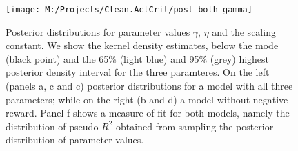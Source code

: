 \documentclass[]{rsos}%
\begin{document}
\begin{figure}

{\centering \texttt{[image: M:/Projects/Clean.ActCrit/post\_both\_gamma]} 

}

\caption{Posterior distributions for parameter values $\gamma$, $\eta$ and the scaling constant. We show the kernel density estimates, below the mode (black point) and the 65\% (light blue) and 95\% (grey)  highest posterior density interval for the three paramteres. On the left (panels a, c and c) posterior distributions for a model with   all three parameters; while on the right (b and d) a model without negative reward. Panel f shows a measure of fit for both models, namely the distribution of pseudo-$R^2$ obtained from sampling the posterior distribution of parameter values.}\label{fig:post}
\end{figure}
\end{document}
